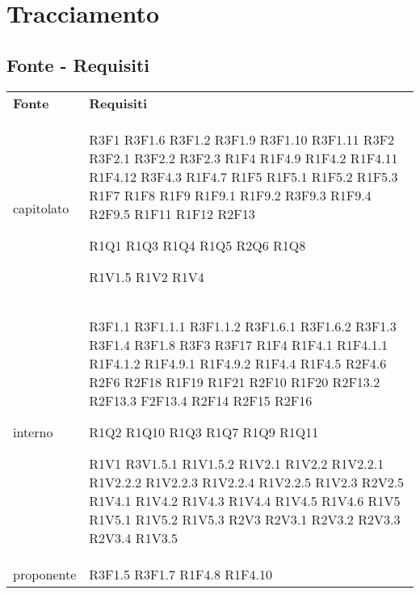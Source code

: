 \section{Tracciamento}
	\subsection{Fonte - Requisiti}
	\begin{longtable} {
		>{\centering}p{28mm}  
		>{}p{20mm}
		}
	\rowcolor{gray!50}
		\textbf{Fonte} & \textbf{Requisiti}	\TBstrut \\
				
		capitolato & 
		R3F1
		R3F1.6
		R3F1.2
		R3F1.9
		R3F1.10
		R3F1.11
		R3F2
		R3F2.1
		R3F2.2
		R3F2.3
		R1F4
		R1F4.9
		R1F4.2
		R1F4.11
		R1F4.12
		R3F4.3
		R1F4.7
		R1F5
		R1F5.1
		R1F5.2
		R1F5.3
		R1F7
		R1F8
		R1F9
		R1F9.1
		R1F9.2
		R3F9.3
		R1F9.4
		R2F9.5
		R1F11
		R1F12
		R2F13

		R1Q1 
		R1Q3 
		R1Q4 
		R1Q5 
		R2Q6
		R1Q8
		 
		R1V1.5
		R1V2
		R1V4 \TBstrut \\ [2mm]
				
		interno & 
		R3F1.1
		R3F1.1.1
		R3F1.1.2
		R3F1.6.1
		R3F1.6.2
		R3F1.3
		R3F1.4
		R3F1.8
		R3F3
		R3F17
		R1F4
		R1F4.1
		R1F4.1.1
		R1F4.1.2
		R1F4.9.1
		R1F4.9.2
		R1F4.4
		R1F4.5
		R2F4.6
		R2F6
		R2F18
		R1F19
		R1F21
		R2F10
		R1F20
		R2F13.2
		R2F13.3
		F2F13.4
		R2F14
		R2F15
		R2F16
		
		R1Q2 
		R1Q10
		R1Q3
		R1Q7
		R1Q9
		R1Q11
		
		R1V1
		R3V1.5.1
		R1V1.5.2 
		R1V2.1 
		R1V2.2 
		R1V2.2.1 
		R1V2.2.2 
		R1V2.2.3 
		R1V2.2.4 
		R1V2.2.5 
		R1V2.3 
		R2V2.5 
		R1V4.1
		R1V4.2
		R1V4.3
		R1V4.4
		R1V4.5
		R1V4.6
		R1V5
		R1V5.1
		R1V5.2
		R1V5.3
		R2V3 
		R2V3.1 
		R2V3.2 
		R2V3.3
		R2V3.4
		R1V3.5 \TBstrut \\ [2mm]

		proponente &
		R3F1.5
		R3F1.7
		R1F4.8
		R1F4.10 \TBstrut \\ [2mm]
				

\end{longtable}
